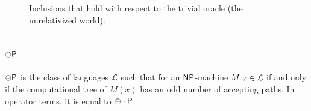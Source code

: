 \begin{figure}[htb]
  \caption{\label{fig:mini-zoo-inclusion} Inclusions that hold with respect to 
  the trivial oracle (the unrelativized world).}
\end{figure}

\subsection{$\oplus\mathsf{P}$}

$\oplus\mathsf{P}$ is the class of languages $\mathcal{L}$ such that for an $\mathsf{NP}$-machine
$M$ $x\in\mathcal{L}$ if and only if the computational tree of $M(x)$ has an odd number
of accepting paths. In operator terms, it is equal to $\oplus\cdot\mathsf{P}$.

